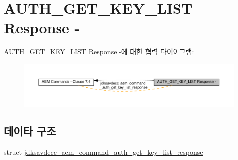 \hypertarget{group__command__auth__get__key__list__response}{}\section{A\+U\+T\+H\+\_\+\+G\+E\+T\+\_\+\+K\+E\+Y\+\_\+\+L\+I\+ST Response -\/}
\label{group__command__auth__get__key__list__response}
A\+U\+T\+H\+\_\+\+G\+E\+T\+\_\+\+K\+E\+Y\+\_\+\+L\+I\+ST Response -\/에 대한 협력 다이어그램\+:
\nopagebreak
\begin{figure}[H]
\begin{center}
\leavevmode
\includegraphics[width=350pt]{group__command__auth__get__key__list__response}
\end{center}
\end{figure}
\subsection*{데이타 구조}
\begin{DoxyCompactItemize}
\item 
struct \hyperlink{structjdksavdecc__aem__command__auth__get__key__list__response}{jdksavdecc\+\_\+aem\+\_\+command\+\_\+auth\+\_\+get\+\_\+key\+\_\+list\+\_\+response}
\end{DoxyCompactItemize}
